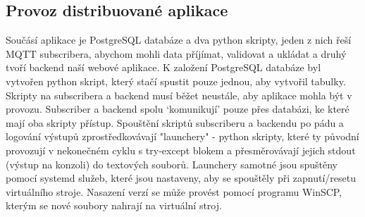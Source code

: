 \subsection{Provoz distribuované aplikace}
Součásí aplikace je PostgreSQL databáze a dva python skripty, jeden z nich řeší MQTT subscribera, abychom mohli data příjímat, validovat a ukládat a druhý tvoří backend naší webové aplikace.
K založení PostgreSQL databáze byl vytvořen python skript, který stačí spustit pouze jednou, aby vytvořil tabulky. Skripty na subscribera a backend musí běžet neustále, aby aplikace mohla být v provozu.
Subscriber a backend spolu `komunikují' pouze přes databázi, ke které mají oba skripty přístup.
Spouštění skriptů subscriberu a backendu po pádu a logování výstupů zprostředkovávají "launchery" - python skripty, které ty původní provozují v nekonečném cyklu s try-except blokem a přesměrovávají jejich stdout (výstup na konzoli) do textových souborů.
Launchery samotné jsou spuštěny pomocí systemd služeb, které jsou nastaveny, aby se spouštěly při zapnutí/resetu virtuálního stroje.
Nasazení verzí se může provést pomocí programu WinSCP, kterým se nové soubory nahrají na virtuální stroj.